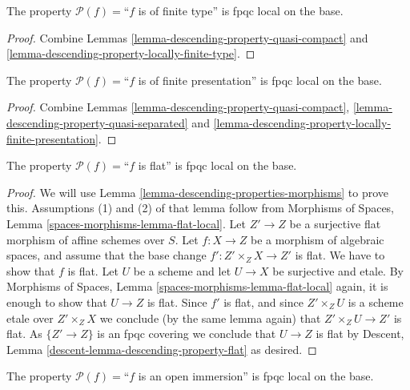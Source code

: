 \begin{lemma}
\label{lemma-descending-property-finite-type}
The property $\mathcal{P}(f) =$``$f$ is of finite type''
is fpqc local on the base.
\end{lemma}

\begin{proof}
Combine Lemmas \ref{lemma-descending-property-quasi-compact}
and \ref{lemma-descending-property-locally-finite-type}.
\end{proof}

\begin{lemma}
\label{lemma-descending-property-finite-presentation}
The property $\mathcal{P}(f) =$``$f$ is of finite presentation''
is fpqc local on the base.
\end{lemma}

\begin{proof}
Combine Lemmas \ref{lemma-descending-property-quasi-compact},
\ref{lemma-descending-property-quasi-separated} and
\ref{lemma-descending-property-locally-finite-presentation}.
\end{proof}

\begin{lemma}
\label{lemma-descending-property-flat}
The property $\mathcal{P}(f) =$``$f$ is flat''
is fpqc local on the base.
\end{lemma}

\begin{proof}
We will use
Lemma \ref{lemma-descending-properties-morphisms}
to prove this. Assumptions (1) and (2) of that lemma follow from
Morphisms of Spaces,
Lemma \ref{spaces-morphisms-lemma-flat-local}.
Let $Z' \to Z$ be a surjective flat morphism of affine schemes over $S$.
Let $f : X \to Z$ be a morphism of algebraic spaces, and assume
that the base change $f' : Z' \times_Z X \to Z'$ is flat.
We have to show that $f$ is flat. Let $U$ be a scheme
and let $U \to X$ be surjective and etale. By
Morphisms of Spaces,
Lemma \ref{spaces-morphisms-lemma-flat-local}
again, it is enough to show that $U \to Z$ is flat.
Since $f'$ is flat, and since $Z' \times_Z U$ is a
scheme etale over $Z' \times_Z X$ we conclude (by the same lemma again) that
$Z' \times_Z U \to Z'$ is flat.
As $\{Z' \to Z\}$ is an fpqc covering we conclude that
$U \to Z$ is flat by
Descent, Lemma \ref{descent-lemma-descending-property-flat}
as desired.
\end{proof}

\begin{lemma}
\label{lemma-descending-property-open-immersion}
The property $\mathcal{P}(f) =$``$f$ is an open immersion''
is fpqc local on the base.
\end{lemma}

